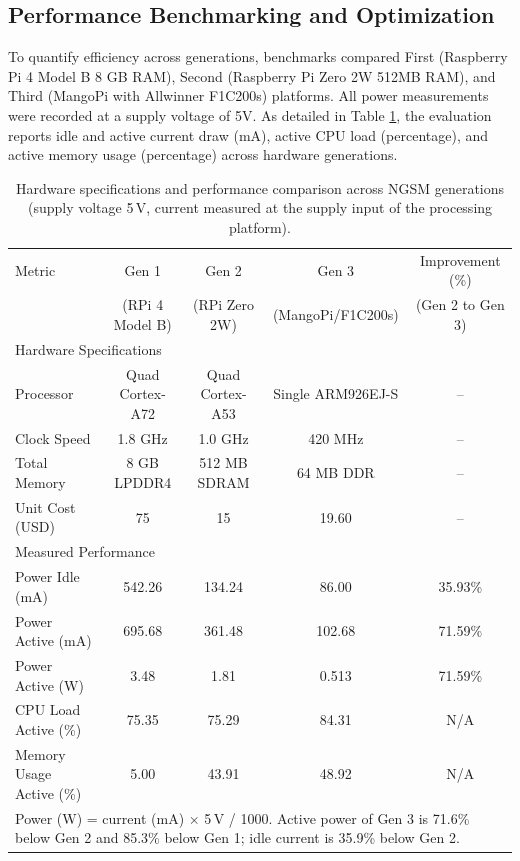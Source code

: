 \documentclass[fleqn,10pt]{wlscirep}
\begin{document}
\subsection{Performance Benchmarking and Optimization}
\label{subsec:benchmarks}

To quantify efficiency across generations, benchmarks compared First (Raspberry Pi 4 Model B 8 GB RAM), Second (Raspberry Pi Zero 2W 512MB RAM), and Third (MangoPi with Allwinner F1C200s) platforms. All power measurements were recorded at a supply voltage of 5V. As detailed in Table \ref{tab:hardwarebenchmarks}, the evaluation reports idle and active current draw (mA), active CPU load (percentage), and active memory usage (percentage) across hardware generations.

\begin{table}[!t]
\centering
\caption{Hardware specifications and performance comparison across NGSM generations (supply voltage 5\,V, current measured at the supply input of the processing platform).}
\label{tab:hardwarebenchmarks}
\small
\begin{tabular}{lcccc}
\toprule
Metric & Gen 1 & Gen 2 & Gen 3 & Improvement (\%) \\
& (RPi 4 Model B) & (RPi Zero 2W) & (MangoPi/F1C200s) & (Gen 2 to Gen 3) \\ \midrule
\multicolumn{5}{l}{Hardware Specifications} \\ 
Processor & Quad Cortex-A72 & Quad Cortex-A53 & Single ARM926EJ-S & -- \\
Clock Speed & 1.8 GHz & 1.0 GHz & 420 MHz & -- \\
Total Memory & 8 GB LPDDR4 & 512 MB SDRAM & 64 MB DDR & -- \\ 
Unit Cost (USD) & 75 & 15 & 19.60 & -- \\ \midrule
\multicolumn{5}{l}{Measured Performance} \\
Power Idle (mA) & 542.26 & 134.24 & 86.00 & 35.93\% \\
Power Active (mA) & 695.68 & 361.48 & 102.68 & 71.59\% \\
Power Active (W) & 3.48 & 1.81 & 0.513 & 71.59\% \\
CPU Load Active (\%) & 75.35 & 75.29 & 84.31 & N/A \\
Memory Usage Active (\%) & 5.00 & 43.91 & 48.92 & N/A \\ \bottomrule
\multicolumn{5}{l}{\footnotesize Power (W) = current (mA) $\times$ 5\,V / 1000. Active power of Gen 3 is 71.6\% below Gen 2 and 85.3\% below Gen 1; idle current is 35.9\% below Gen 2.}

\end{tabular}
\end{table}
\end{document}
